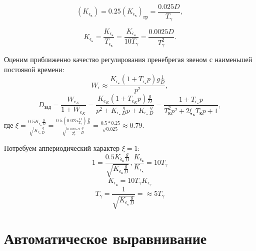 \documentclass{article}
\begin{document}
\[
(K_{\epsilon_\text{к}}) = 0.25 (K_{\dot{\epsilon}_{\text{к}}})_{\text{гр}} = \frac{0.025 D}{T_{\gamma}},
\]

\[
K_{\epsilon_\text{к}} = \frac{K_{\dot{\epsilon}_{\text{к}}}}{T_{\epsilon_\text{к}}} = \frac{K_{\dot{\epsilon}_{\text{к}}}}{10 T_\gamma} = \frac{0.0025 D}{T_\gamma^2}.
\]

Оценим приближенно качество регулирования пренебрегая звеном с наименьшей постояной времени:
\[
    W_{\epsilon} \approx \frac{K_{\epsilon_\text{к}}(1 + T_{\epsilon_\text{к}} p)g \frac{1}{D}}{p^2},
\] 
\[
    D_\text{зад} = \frac{W_{e_K}}{1 + W_{e_K}} = \frac{K_{e_K} (1 + T_{e_K} p) \frac{g}{D}}{ p^2 + K_{\dot{\epsilon}_{\text{к}}} \frac{g}{D}p + K_{\epsilon_\text{к}} \frac{g}{D}} = \frac{1 + T_{\epsilon_\text{к}}p }{T_\text{к}^2 p^2 + 2 \xi_\text{к} T_\text{к} p + 1},
\]
где $\xi = \frac{0.5 K_{\dot{\epsilon}_{\text{к}}} \frac{g}{D}}{\sqrt{K_{\epsilon_\text{к}} \frac{g}{D}}} =\frac{0.5(0.025 \frac{D}{T_\gamma}) \frac{g}{D}}{\sqrt{\frac{0.0025 D}{T^2_\gamma} \frac{g}{D}}} = \frac{0.5 * 0.25}{\sqrt{0.025}} \approx 0.79$.

Потребуем аппериодический характер $\xi = 1$:
\[
    1 = \frac{0.5 K_{\dot{\epsilon}_{\text{к}}} \frac{g}{D}}{\sqrt{K_{{\epsilon}_{\text{к}}} \frac{g}{D}}},  \frac{K_{\dot{\epsilon}_{\text{к}}}}{K_{{\epsilon}_{\text{к}}}} = 10 T_\gamma
\]
\[
    K_{\dot{\epsilon}_{\text{к}}} = 10 T_{\gamma}  K_{\epsilon_\gamma}
\]
\[
    T_\gamma  = \frac{1}{\sqrt{K_{\epsilon_\text{к}}\frac{g}{D}}} = \approx 5 T_\gamma 
\]

\section{Автоматическое выравнивание}
\end{document}
